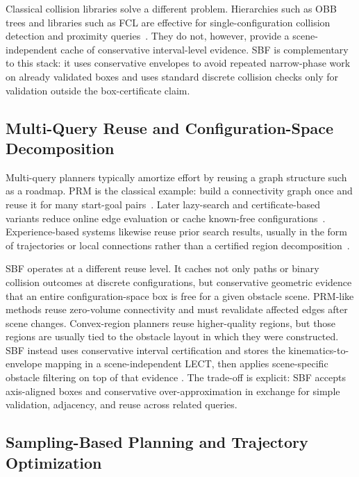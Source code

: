 \documentclass[journal]{IEEEtran}
\begin{document}
Classical collision libraries solve a different problem. Hierarchies such as
OBB trees and libraries such as FCL are effective for single-configuration
collision detection and proximity queries~\cite{gottschalk1996obbtree,
pan2012fcl,gilbert1988fast}. They do not, however, provide a scene-independent
cache of conservative interval-level evidence. SBF is complementary to this stack:
it uses conservative envelopes to avoid repeated narrow-phase work on already
validated boxes and uses standard discrete collision checks only for validation
outside the box-certificate claim.

\subsection{Multi-Query Reuse and Configuration-Space Decomposition}

Multi-query planners typically amortize effort by reusing a graph structure such
as a roadmap. PRM is the classical example: build a connectivity graph once and
reuse it for many start-goal pairs~\cite{kavraki1996probabilistic,
bohlin2000path}. Later lazy-search and certificate-based variants reduce online
edge evaluation or cache known-free configurations~\cite{dellin2016unifying,
schmerling2015optimal}. Experience-based systems likewise reuse prior search
results, usually in the form of trajectories or local connections rather than a
certified region decomposition~\cite{coleman2014moveit}.

SBF operates at a different reuse level. It caches not only paths or binary
collision outcomes at discrete configurations, but conservative geometric
evidence that an entire configuration-space box is free for a given obstacle
scene. PRM-like methods reuse zero-volume connectivity and must revalidate
affected edges after scene changes. Convex-region planners reuse higher-quality
regions, but those regions are usually tied to the obstacle layout in which
they were constructed. SBF instead uses conservative interval certification and
stores the kinematics-to-envelope mapping in a scene-independent LECT, then
applies scene-specific obstacle filtering on top of that evidence
\cite{lozanoperez1983spatial,brooks1985subdivision}. The trade-off is explicit:
SBF accepts axis-aligned boxes and conservative over-approximation in exchange
for simple validation, adjacency, and reuse across related queries.

\subsection{Sampling-Based Planning and Trajectory Optimization}
\end{document}

